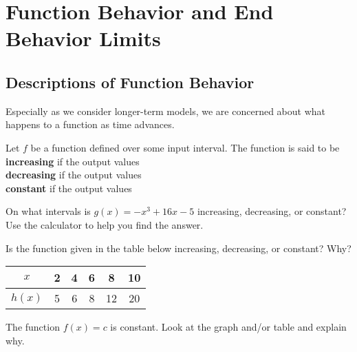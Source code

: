 \documentclass[notes]{subfiles}
\begin{document}
	\fancyhead[LO,RE]{\bfseries \currentname}
	\fancyfoot[C]{{}}
	\fancyfoot[RO,LE]{\large \thepage}	%

\section*{Function Behavior and End Behavior Limits}\label{cs12}
	\subsection*{Descriptions of Function Behavior}
		Especially as we consider longer-term models, we are concerned about what happens to a function as time advances. \\[5pt]
		\begin{defn}
			Let $f$ be a function defined over some input interval.  The function is said to be \\[15pt]
				\tabitem \textbf{increasing} if the output values  \\
				\tabitem \textbf{decreasing} if the output values  \\
				\tabitem \textbf{constant} if the output values 
		\end{defn} 
		
		\begin{ex}
			On what intervals is $g(x) = -x^3 + 16x -5$ increasing, decreasing, or constant? Use the calculator to help you find the answer.
		\end{ex}
		\begin{ex}
			Is the function given in the table below increasing, decreasing, or constant?  Why?
			\begin{center}
				{\renewcommand{\arraystretch}{1.2}
				\begin{tabular}{|c||c|c|c|c|c|}\hline
					$x$ 	& 2 & 4 & 6 & 8 & 10 \\ \hline
					$h(x)$  & 5 & 6 & 8 & 12& 20 \\ \hline
				\end{tabular}
				}
			\end{center}
		\end{ex}
		\begin{ex}
			The function $f(x) = c$ is constant. Look at the graph and/or table and explain why.
		\end{ex}
			\newpage
\end{document}
